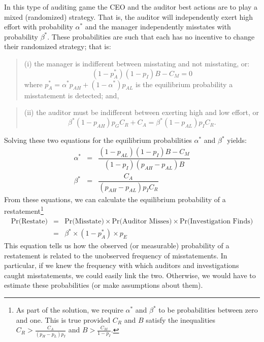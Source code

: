 In this type of auditing game the CEO and the auditor best actions are to play a mixed (randomized) strategy. %
That is, the auditor will independently exert high effort with probability $\alpha^*$ 
and the manager independently misstates with probability $\beta^*$. 
These probabilities 
are such that each has no incentive to change their randomized strategy; that is:
\begin{quote}
(i) the manager is indifferent between misstating and not misstating, or:
\begin{equation}\label{manager}
(1 - p_A^*)(1 - p_I) B - C_M = 0 
\end{equation}
where $p_A^* = \alpha^* p_{AH }+ (1-\alpha^*) p_{AL}$ is the equilibrium 
probability a misstatement is detected; and,
\end{quote}
\begin{quote} (ii) the auditor must be
indifferent between exerting high and low effort, or
$$ \beta^* (1-p_{AH}) p_G C_R + C_A = \beta^* (1-p_{AL}) p_I C_R .$$
\end{quote}

Solving these two equations for the equilibrium probabilities $\alpha^*$ and $\beta^*$
yields:
\begin{equation}\label{equilstrat}
\begin{array}{lcl}
  \alpha^* &= & \dfrac{ ( 1 - p_{AL}) (1 - p_I) B- C_M}{ (1 - p_I) (p_{AH}-p_{AL}) B}\\[1.5em]
  \beta^* &= & \dfrac{C_A}{(p_{AH}-p_{AL}) p_I C_R}  
\end{array}
\end{equation}
From these equations, we can calculate the equilibrium probability of a restatement\footnote{
As part of the solution, we require $\alpha^*$ and $\beta^*$ to be probabilities between
zero and one. 
This is true provided $C_R$ and $B$ satisfy the inequalities
$ C_R > \frac{C_A}{(p_H-p_L)p_I} $
and 
$ B > \frac{C_M}{1 - p_I}  $.}
\begin{equation} \label{equilpr1}
\begin{array}{lcl}
\mbox{Pr(Restate)} & = &  \mbox{Pr(Misstate)} \times \mbox{Pr(Auditor Misses)} \times
\mbox{Pr(Investigation Finds)}\\[1em]
& = & \beta^* \times (1-p_A^*) \times p_{E}
\end{array}\end{equation}
This equation tells us how the observed (or measurable) probability of a restatement is related to
the unobserved frequency of misstatements. In particular, if we knew the frequency with which auditors and investigations caught misstatements, we could easily link the two. Otherwise,
we would have to estimate these probabilities (or make assumptions about them).

